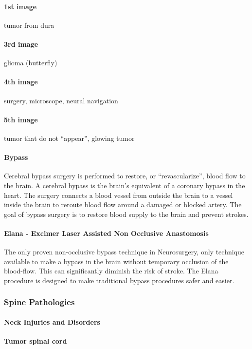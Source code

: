 \documentclass[12pt,article,oneside,a4paper]{memoir}
\begin{document}
\paragraph{1st image} tumor from dura
\paragraph{3rd image} glioma (butterfly)
\paragraph{4th image} surgery, microscope, neural navigation
\paragraph{5th image} tumor that do not ``appear'', glowing tumor
 
\paragraph{Bypass}
Cerebral bypass surgery is performed to restore, or ``revascularize'', blood 
flow to the brain. A cerebral bypass is the brain's equivalent of a coronary
bypass in the heart. The surgery connects a blood vessel from outside the brain
to a vessel inside the brain to reroute blood flow around a damaged or blocked
artery. The goal of bypass surgery is to restore blood supply to the brain and
prevent strokes.

\paragraph{Elana - Excimer Laser Assisted Non Occlusive Anastomosis}
The only proven non-occlusive bypass technique in Neurosurgery, only technique
available to make a bypass in the brain without temporary occlusion of the
blood-flow. This can significantly diminish the risk of stroke. The Elana
procedure is designed to make traditional bypass procedures safer and easier.

\subsubsection{Spine Pathologies}
\paragraph{Neck Injuries and Disorders}
\paragraph{Tumor spinal cord} 
\end{document}
